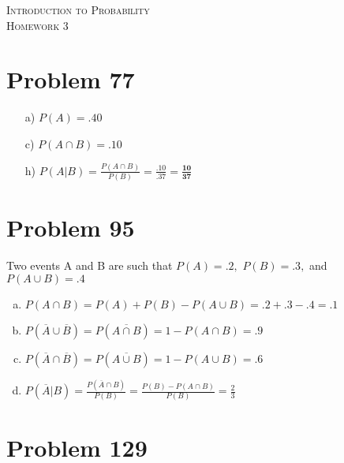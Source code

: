 \documentclass{article}
\begin{document}
\begin{center}
  \textsc{\Large Introduction to Probability}\\[.3cm]
  \textsc{\Large Homework 3}
\end{center}

\section*{Problem 77}
\begin{enumerate}[a)]
\item[a)] $P(A) = \mathbf{.40}$
\item[c)] $P(A \cap B) = \mathbf{.10}$
\item[h)] $P(A|B) = \frac{P(A \cap B)}{P(B)} = \frac{.10}{.37} = \mathbf{\frac{10}{37}}$
\end{enumerate}

\section*{Problem 95}
Two events A and B are such that $P(A) = .2,$ $P(B) = .3,$ and $P(A \cup B) = .4$
\begin{enumerate}[a)]
\item $P(A \cap B) = P(A) + P(B) - P(A \cup B) = .2 + .3 - .4 = \mathbf{.1}$
\item $P(\overline{A} \cup \overline{B}) = P(\overline{A \cap B}) = 1 - P(A \cap B) = \mathbf{.9}$
\item $P(\overline{A} \cap \overline{B}) = P(\overline{A \cup B}) = 1 - P(A \cup B) = \mathbf{.6}$
\item $P(\overline{A}|B) = \frac{P(\overline{A} \cap B)}{P(B)} = \frac{P(B) - P(A \cap B)}{P(B)} = \frac{2}{3}$
\end{enumerate}

\section*{Problem 129}
\end{document}
